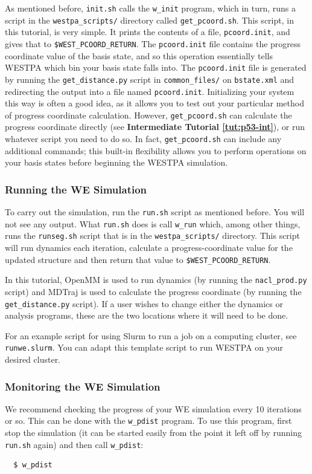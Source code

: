 As mentioned before, \verb|init.sh| calls the \verb|w_init| program, which in turn, runs a script in the \verb|westpa_scripts/| directory called \verb|get_pcoord.sh|. 
This script, in this tutorial, is very simple. 
It prints the contents of a file, \verb|pcoord.init|, and gives that to \verb|$WEST_PCOORD_RETURN|.
The \verb|pcoord.init| file contains the progress coordinate value of the basis state, and so this operation essentially tells WESTPA which bin your basis state falls into. 
The \verb|pcoord.init| file is generated by running the \verb|get_distance.py| script in \verb|common_files/| on \verb|bstate.xml| and redirecting the output into a file named \verb|pcoord.init|. 
Initializing your system this way is often a good idea, as it allows you to test out your particular method of progress coordinate calculation.  
However, \verb|get_pcoord.sh| can calculate the progress coordinate directly (see \textbf{Intermediate Tutorial \ref{tut:p53-int}}), or run whatever script you need to do so.  
In fact, \verb|get_pcoord.sh| can include any additional commands; this built-in flexibility allows you to perform operations on your basis states before beginning the WESTPA simulation. 

\subsubsection{Running the WE Simulation}

To carry out the simulation, run the \verb|run.sh| script as mentioned before. 
You will not see any output. What \verb|run.sh| does is call \verb|w_run| which, among other things, runs the \verb|runseg.sh| script that is in the \verb|westpa_scripts/| directory. 
This script will run dynamics each iteration, calculate a progress-coordinate value for the updated structure and then return that value to \verb|$WEST_PCOORD_RETURN|. 

In this tutorial, OpenMM is used to run dynamics (by running the \verb|nacl_prod.py| script) and MDTraj is used to calculate the progress coordinate (by running the \verb|get_distance.py| script).  
If a user wishes to change either the dynamics or analysis programs, these are the two locations where it will need to be done. 

For an example script for using Slurm to run a job on a computing cluster, see \verb|runwe.slurm|. 
You can adapt this template script to run WESTPA on your desired cluster.  

\subsubsection{Monitoring the WE Simulation}
\label{tut:basic-nacl-monitoring}
We recommend checking the progress of your WE simulation every 10 iterations or so. 
This can be done with the \verb|w_pdist| program. To use this program, first stop the simulation (it can be started easily from the point it left off by running \verb|run.sh| again) and then call \verb|w_pdist|:
\begin{verbatim}
  $ w_pdist
\end{verbatim}

